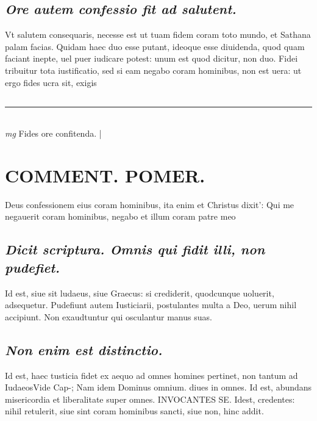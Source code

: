 \documentclass{article}
\begin{document}
\begin{pages}
\subsection*{\textit{Ore autem confessio fit ad salutent. }}\pstart Vt salutem consequaris, necesse est ut tuam fidem coram toto mundo, et Sathana palam facias. Quidam haec duo esse putant, ideoque esse diuidenda, quod quam faciant inepte, uel puer iudicare potest: unum est quod dicitur, non duo. Fidei tribuitur tota iustificatio, sed si eam negabo coram hominibus, non est uera: ut ergo fides ucra sit, exigis  \pend
{}
{}
\subsection*{\textit{}}
\vspace{0.5cm}\noindent
\vspace{0.2cm}\rule{1cm}{0.2pt}\\ 
\hspace{0.2cm}\textit{mg}
\footnotesize Fides ore confitenda.  
\normalsize| 
\section*{COMMENT. POMER.  }\pstart Deus confessionem eius coram hominibus, ita enim et Christus dixit': Qui me negauerit coram hominibus, negabo et illum coram patre meo\pend
{}
{}
\subsection*{\textit{Dicit scriptura. Omnis qui fidit illi, non pudefiet. }}\pstart Id est, siue sit ludaeus, siue Graecus: si crediderit, quodcunque uoluerit, adsequetur. Pudefiunt autem Iusticiarii, postulantes multa a Deo, uerum nihil accipiunt. Non exaudtuntur qui osculantur manus suas.  \pend
{}
{}
\subsection*{\textit{Non enim est distinctio. }}\pstart Id est, haec tusticia fidet ex aequo ad omnes homines pertinet, non tantum ad IudaeosVide Cap-;  \pend\pstart Nam idem Dominus omnium. diues in omnes.  \pend\pstart Id est, abundans misericordia et liberalitate super omnes. INVOCANTES SE. Idest, credentes: nihil retulerit, siue sint coram hominibus sancti, siue non, hinc addit.   \pend
{}
{}

\end{pages}
\end{document}
